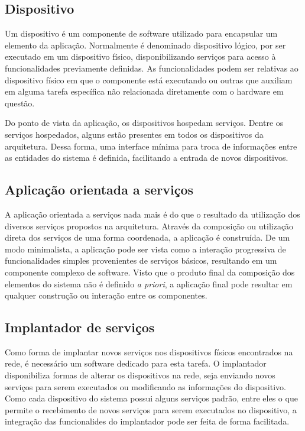 \subsection{Dispositivo}

Um dispositivo é um componente de software utilizado para encapsular um elemento da aplicação.
Normalmente é denominado dispositivo lógico, por ser executado em um dispositivo físico,
disponibilizando serviços para acesso à funcionalidades previamente definidas. As funcionalidades
podem ser relativas ao dispositivo físico em que o componente está executando ou outras que auxiliam
em alguma tarefa específica não relacionada diretamente com o hardware em questão.

Do ponto de vista da aplicação, os dispositivos hospedam serviços. Dentre os serviços hospedados,
alguns estão presentes em todos os dispositivos da arquitetura. Dessa forma, uma interface mínima
para troca de informações entre as entidades do sistema é definida, facilitando a entrada de novos
dispositivos.


\subsection{Aplicação orientada a serviços}

A aplicação orientada a serviços nada mais é do que o resultado da utilização dos diversos serviços
propostos na arquitetura. Através da composição ou utilização direta dos serviços de uma forma
coordenada, a aplicação é construída. De um modo minimalista, a aplicação pode ser vista como a
interação progressiva de funcionalidades simples provenientes de serviços básicos, resultando em um
componente complexo de software. Visto que o produto final da composição dos elementos do sistema
não é definido \textit{a priori}, a aplicação final pode resultar em
qualquer construção ou interação entre os componentes.

\subsection{Implantador de serviços}

Como forma de implantar novos serviços nos dispositivos físicos encontrados na rede, é necessário um
software dedicado para esta tarefa. O implantador disponibiliza formas de alterar os dispositivos na
rede, seja enviando novos serviços para serem executados ou modificando as informações do
dispositivo. Como cada dispositivo do sistema possui alguns serviços padrão, entre eles o que
permite o recebimento de novos serviços para serem executados no dispositivo, a integração das
funcionalides do implantador pode ser feita de forma facilitada.


